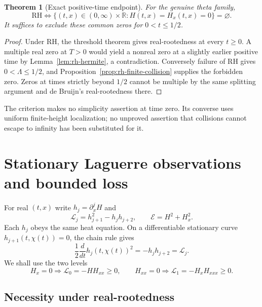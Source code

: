 \documentclass[11pt]{article}
\numberwithin{equation}{section}
\newtheorem{theorem}{Theorem}[section]
\theoremstyle{definition}
\theoremstyle{remark}
\begin{document}
\begin{theorem}[Exact positive-time endpoint]\label{thm:rh-endpoint}
For the genuine theta family,
\begin{equation}
 \mathrm{RH}\iff
 \{(t,x)\in(0,\infty)\times\mathbb R:
 H(t,x)=H_x(t,x)=0\}=\varnothing.
 \label{eq:rh-no-joint-zero}
\end{equation}
It suffices to exclude these common zeros for $0<t\le1/2$.
\end{theorem}
\begin{proof}
Under RH, the threshold theorem gives real-rootedness at every $t\ge0$.
A multiple real zero at $T>0$ would yield a nonreal zero at a slightly
earlier positive time by Lemma~\ref{lem:rh-hermite}, a contradiction.
Conversely failure of RH gives $0<\Lambda\le1/2$, and
Proposition~\ref{prop:rh-finite-collision} supplies the forbidden zero.
Zeros at times strictly beyond $1/2$ cannot be multiple by the same
splitting argument and de Bruijn's real-rootedness there.
\end{proof}
The criterion makes no simplicity assertion at time zero.  Its converse
uses uniform finite-height localization; no unproved assertion that
collisions cannot escape to infinity has been substituted for it.

\section{Stationary Laguerre observations and bounded loss}
\label{sec:rh-stationary}

For real $(t,x)$ write $h_j=\partial_x^jH$ and
\begin{equation}
 \mathscr L_j=h_{j+1}^2-h_jh_{j+2},\qquad
 \mathcal E=H^2+H_x^2.
 \label{eq:rh-laguerre-energy}
\end{equation}
Each $h_j$ obeys the same heat equation.  On a differentiable stationary
curve $h_{j+1}(t,\chi(t))=0$, the chain rule gives
\begin{equation}
 \frac12\frac d{dt}h_j(t,\chi(t))^2
 =-h_jh_{j+2}=\mathscr L_j.
 \label{eq:rh-stationary-evolution}
\end{equation}
We shall use the two levels
\begin{equation}
 H_x=0\Longrightarrow\mathscr L_0=-HH_{xx}\ge0,
 \qquad
 H_{xx}=0\Longrightarrow\mathscr L_1=-H_xH_{xxx}\ge0.
 \label{eq:rh-two-signs}
\end{equation}

\subsection{Necessity under real-rootedness}
\end{document}
